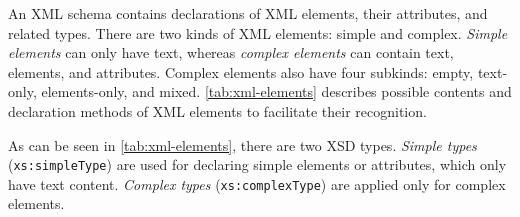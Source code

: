 An XML schema contains declarations of XML elements, their attributes, and related types.
There are two kinds of XML elements: simple and complex.
\emph{Simple elements} can only have text, whereas \emph{complex elements} can contain text, elements, and attributes.
Complex elements also have four subkinds: empty, text-only, elements-only, and mixed.
\autoref{tab:xml-elements} describes possible contents and declaration methods of XML elements to facilitate their recognition.






    
    



As can be seen in \autoref{tab:xml-elements}, there are two XSD types.
\emph{Simple types} (\texttt{xs:simpleType}) are used for declaring simple elements or attributes, which only have text content.
\emph{Complex types} (\texttt{xs:complexType}) are applied only for complex elements.

